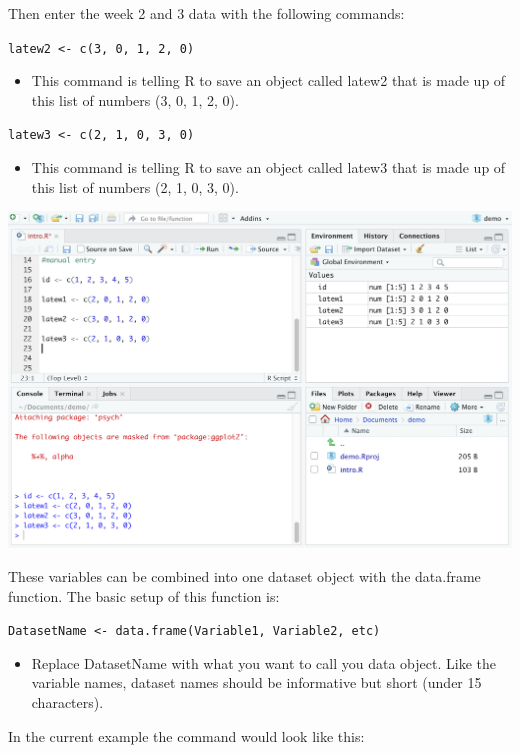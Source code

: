 \documentclass[
]{book}
\providecommand{\tightlist}{%
  \setlength{\itemsep}{0pt}\setlength{\parskip}{0pt}}
\begin{document}
Then enter the week 2 and 3 data with the following commands:

\texttt{latew2\ \textless{}-\ c(3,\ 0,\ 1,\ 2,\ 0)}

\begin{itemize}
\tightlist
\item
  This command is telling R to save an object called latew2 that is made up of this list of numbers (3, 0, 1, 2, 0).
\end{itemize}

\texttt{latew3\ \textless{}-\ c(2,\ 1,\ 0,\ 3,\ 0)}

\begin{itemize}
\tightlist
\item
  This command is telling R to save an object called latew3 that is made up of this list of numbers (2, 1, 0, 3, 0).
\end{itemize}

\includegraphics{img/DATA THINGS 1R3.png}

These variables can be combined into one dataset object with the data.frame function. The basic setup of this function is:

\texttt{DatasetName\ \textless{}-\ data.frame(Variable1,\ Variable2,\ etc)}

\begin{itemize}
\tightlist
\item
  Replace DatasetName with what you want to call you data object. Like the variable names, dataset names should be informative but short (under 15 characters).
\end{itemize}

In the current example the command would look like this:
\end{document}
